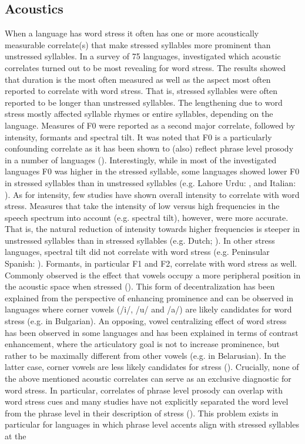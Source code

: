 \subsection{Acoustics} \label{sec111}
When a language has word stress it often has one or more acoustically measurable correlate(s) that make stressed syllables more prominent than unstressed syllables. In a survey of 75 languages, \citet{gordon_acoustic_2017} investigated which acoustic correlates turned out to be most revealing for word stress. The results showed that duration is the most often measured as well as the aspect most often reported to correlate with word stress. That is, stressed syllables were often reported to be longer than unstressed syllables. The lengthening due to word stress mostly affected syllable rhymes or entire syllables, depending on the language. Measures of F0 were reported as a second major correlate, followed by intensity, formants and spectral tilt. It was noted that F0 is a particularly confounding correlate as it has been shown to (also) reflect phrase level prosody in a number of languages (\citealt{gordon_acoustic_2017}). Interestingly, while in most of the investigated languages F0 was higher in the stressed syllable, some languages showed lower F0 in stressed syllables than in unstressed syllables (e.g. Lahore Urdu: \citealt{hussain_phonetic_2007}, and Italian: \citealt{eriksson_acoustics_2016}). As for intensity, few studies have shown overall intensity to correlate with word stress. Measures that take the intensity of low versus high frequencies in the speech spectrum into account (e.g. spectral tilt), however, were more accurate. That is, the natural reduction of intensity towards higher frequencies is steeper in unstressed syllables than in stressed syllables (e.g. Dutch; \citealt{sluijter_spectral_1996}). In other stress languages, spectral tilt did not correlate with word stress (e.g. Peninsular Spanish: \citealt{ortega-llebaria_acoustic_2011}). Formants, in particular F1 and F2, correlate with word stress as well. Commonly observed is the effect that vowels occupy a more peripheral position in the acoustic space when stressed (\citealt{crosswhite_vowel_2004}). This form of decentralization has been explained from the perspective of enhancing prominence and can be observed in languages where corner vowels (/i/, /u/ and /a/) are likely candidates for word stress (e.g. in Bulgarian). An opposing, vowel centralizing effect of word stress has been observed in some languages and has been explained in terms of contrast enhancement, where the articulatory goal is not to increase prominence, but rather to be maximally different from other vowels (e.g. in Belarusian). In the latter case, corner vowels are less likely candidates for stress (\citealt{crosswhite_vowel_2004}). Crucially, none of the above mentioned acoustic correlates can serve as an exclusive diagnostic for word stress. In particular, correlates of phrase level prosody can overlap with word stress cues and many studies have not explicitly separated the word level from the phrase level in their description of stress (\citealt{roettger_methodological_2017}). This problem exists in particular for languages in which phrase level accents align with stressed syllables at the 